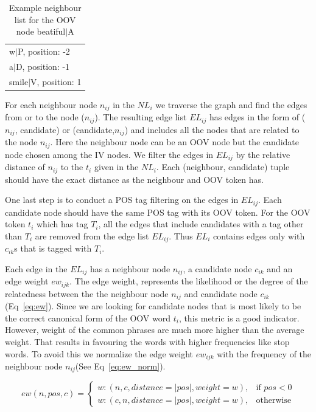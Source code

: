 \documentclass[preprint,review,12pt]{elsarticle}
\begin{document}
\begin{table}[hbt]
  \centering
  \begin{tabular}[tc]{l}
    w$|$P, position: -2 \\
    a$|$D, position: -1 \\
    smile$|$V, position: 1 \\
  \end{tabular}
\caption{Example neighbour list for the OOV node beatiful$|$A}
\label{tab:neigh}
\end{table}


For each neighbour node $n_{ij}$ in the $NL_i$  we traverse the graph and find the edges from or to the node ($n_{ij}$). The resulting edge list $EL_{ij}$ has edges in the form of ($n_{ij}$, candidate) or (candidate,$n_{ij}$) and includes all the nodes that are related to the node $n_{ij}$. Here the neighbour node can be an OOV node but the candidate node chosen among the IV nodes. We filter the edges in $EL_{ij}$ by the relative distance of $n_{ij}$ to the $t_i$ given in the $NL_i$. Each (neighbour, candidate) tuple should have the exact distance as the neighbour and OOV token has.

One last step is to conduct a POS tag filtering on the edges in $EL_{ij}$. Each candidate node should have the same POS tag with its OOV token. For the OOV token $t_i$ which has tag $T_i$, all the edges that include candidates with a tag other than $T_i$ are removed from the edge list $EL_{ij}$. Thus $EL_{i}$ contains edges only with $c_{ik}$s that is tagged with $T_i$.

Each edge in the $EL_{ij}$ has a neighbour node $n_{ij}$, a candidate node $c_{ik}$ and an edge weight $ew_{ijk}$. The edge weight, represents the likelihood or the degree of the relatedness between the the neighbour node $n_{ij}$ and candidate node $c_{ik}$(Eq~\ref{eq:ew}). Since we are looking for candidate nodes that is most likely to be the correct canonical form of the OOV word $t_i$, this metric is a good indicator. However, weight of the common phrases are much more higher than the average weight. That results in favouring the words with higher frequencies like stop words. To avoid this we normalize the edge weight $ew_{ijk}$ with the frequency of the neighbour node $n_{ij}$(See Eq~\ref{eq:ew_norm}).

\begin{equation}
ew(n,pos,c) =
\begin{cases}
  w : (n,c,distance = |pos|,weight=w), & \text{if } pos < 0 \\
  w : (c,n,distance = |pos|,weight=w), & \text{otherwise}
\end{cases}
\label{eq:ew}
\end{equation}
\end{document}
